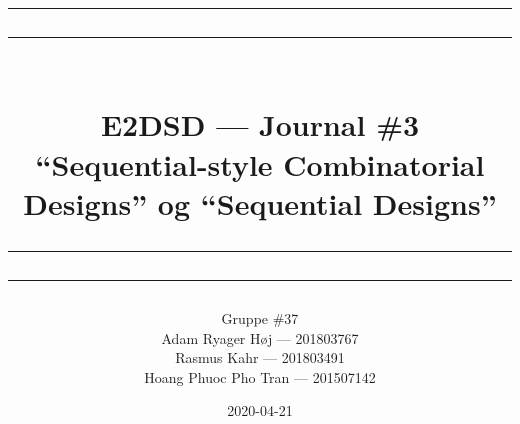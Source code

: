 \documentclass[10pt,a4paper,onesided]{article}
\newcommand\mymaketitle[1]{
   \rule{\textwidth}{1.6pt}\vspace*{-\baselineskip}\vspace*{2pt}
   \rule{\textwidth}{0.4pt}
   \\   
   \huge \bf #1\\
   \vspace{-8pt}
   \rule{\textwidth}{0.4pt}\vspace*{-\baselineskip}\vspace{3.2pt}
   \rule{\textwidth}{1.6pt}
}
\begin{document}

\title{
   \mymaketitle{E2DSD --- Journal \#3\\``Sequential-style Combinatorial Designs'' og ``Sequential Designs''}
}
\author{
   Gruppe \#37\\
   Adam Ryager Høj --- 201803767\\
   Rasmus Kahr --- 201803491\\
   Hoang Phuoc Pho Tran --- 201507142
}
\date{2020-04-21}

\maketitle
\clearpage

\tableofcontents

\clearpage

\lstlistoflistings

\listoffigures

\clearpage


\clearpage


\end{document}
